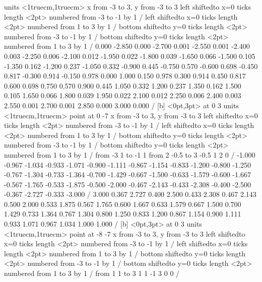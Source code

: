 \figure
\texonly
\vbox{\beginpicture
\normalgraphs
\sevenpoint
{}
\setcoordinatesystem units <1truecm,1truecm>
\setplotarea x from -3 to 3, y from -3 to 3
\axis left shiftedto x=0 ticks length <2pt> numbered from -3 to -1 by 1 /
\axis left shiftedto x=0 ticks length <2pt> numbered from 1 to 3 by 1 /
\axis bottom shiftedto y=0 ticks length <2pt> numbered from -3 to -1 by 1 /
\axis bottom shiftedto y=0 ticks length <2pt> numbered from 1 to 3 by 1 /
\setquadratic
{} 0.000 -2.850 0.000 -2.700 0.001 -2.550 0.001 -2.400 0.003 
-2.250 0.006 -2.100 0.012 -1.950 0.022 -1.800 0.039 -1.650 0.066 
-1.500 0.105 -1.350 0.162 -1.200 0.237 -1.050 0.332 -0.900 0.445 
-0.750 0.570 -0.600 0.698 -0.450 0.817 -0.300 0.914 -0.150 0.978 
0.000 1.000 0.150 0.978 0.300 0.914 0.450 0.817 0.600 0.698 
0.750 0.570 0.900 0.445 1.050 0.332 1.200 0.237 1.350 0.162 
1.500 0.105 1.650 0.066 1.800 0.039 1.950 0.022 2.100 0.012 
2.250 0.006 2.400 0.003 2.550 0.001 2.700 0.001 2.850 0.000 
3.000 0.000 /
 [b] <0pt,3pt> at 0 3
\setcoordinatesystem units <1truecm,1truecm> point at 0 -7
\setplotarea x from -3 to 3, y from -3 to 3
\axis left shiftedto x=0 ticks length <2pt> numbered from -3 to -1 by 1 /
\axis left shiftedto x=0 ticks length <2pt> numbered from 1 to 3 by 1 /
\axis bottom shiftedto y=0 ticks length <2pt> numbered from -3 to -1 by 1 /
\axis bottom shiftedto y=0 ticks length <2pt> numbered from 1 to 3 by 1 /
\setlinear
\putrule from -3 1 to -1 1
\putrule from 2 -0.5 to 3 -0.5
 1 2 0 /
\setquadratic
{} -1.000 -0.967 -1.034 -0.933 -1.071 -0.900 -1.111 -0.867 -1.154 
-0.833 -1.200 -0.800 -1.250 -0.767 -1.304 -0.733 -1.364 -0.700 -1.429 
-0.667 -1.500 -0.633 -1.579 -0.600 -1.667 -0.567 -1.765 -0.533 -1.875 
-0.500 -2.000 -0.467 -2.143 -0.433 -2.308 -0.400 -2.500 -0.367 -2.727 
-0.333 -3.000 /
 3.000 0.367 2.727 0.400 2.500 0.433 2.308 0.467 2.143 
0.500 2.000 0.533 1.875 0.567 1.765 0.600 1.667 0.633 1.579 
0.667 1.500 0.700 1.429 0.733 1.364 0.767 1.304 0.800 1.250 
0.833 1.200 0.867 1.154 0.900 1.111 0.933 1.071 0.967 1.034 
1.000 1.000 /
 [b] <0pt,3pt> at 0 3
\setcoordinatesystem units <1truecm,1truecm> point at -8 -7
\setplotarea x from -3 to 3, y from -3 to 3
\axis left shiftedto x=0 ticks length <2pt> numbered from -3 to -1 by 1 /
\axis left shiftedto x=0 ticks length <2pt> numbered from 1 to 3 by 1 /
\axis bottom shiftedto y=0 ticks length <2pt> numbered from -3 to -1 by 1 /
\axis bottom shiftedto y=0 ticks length <2pt> numbered from 1 to 3 by 1 /
\setlinear
\putrule from 1 1 to 3 1
 1 -1 3 0 0 /
}

